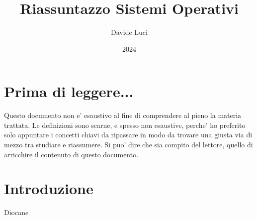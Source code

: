 \documentclass{article}
\title{Riassuntazzo Sistemi Operativi}
\author{Davide Luci}
\date{2024}
\begin{document}
    \maketitle
    \tableofcontents
    \newpage


    \setlength{\parindent}{0pt}
    \section{ Prima di leggere...}
    Questo documento non e' esaustivo al fine di comprendere al pieno la materia trattata.
    Le definizioni sono scarne, e spesso non esaustive, perche' ho preferito solo appuntare i concetti chiavi
    da ripassare in modo da trovare una giusta via di mezzo tra studiare e riassumere. Si puo' dire che sia compito del 
    lettore, quello di arricchire il contenuto di questo documento.

    \newpage

    \section*{ Introduzione}
    Diocane
    
    
\end{document}
